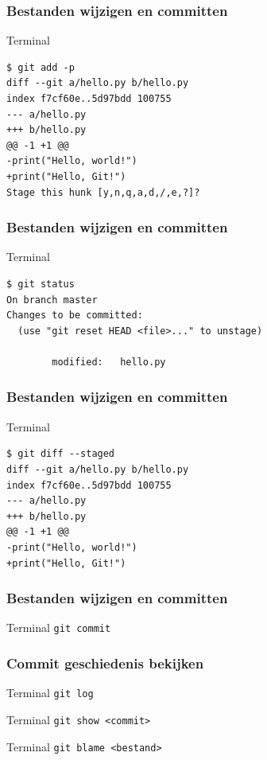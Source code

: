 \documentclass[]{beamer}
\begin{document}
\begin{frame}[fragile]
    \frametitle{Bestanden wijzigen en committen}

    \begin{block}{Terminal}
\begin{Verbatim}[fontsize=\tiny]
$ git add -p
diff --git a/hello.py b/hello.py
index f7cf60e..5d97bdd 100755
--- a/hello.py
+++ b/hello.py
@@ -1 +1 @@
-print("Hello, world!")
+print("Hello, Git!")
Stage this hunk [y,n,q,a,d,/,e,?]?
\end{Verbatim}
    \end{block}
\end{frame}

\begin{frame}[fragile]
    \frametitle{Bestanden wijzigen en committen}

    \begin{block}{Terminal}
\begin{Verbatim}[fontsize=\tiny]
$ git status
On branch master
Changes to be committed:
  (use "git reset HEAD <file>..." to unstage)

        modified:   hello.py
\end{Verbatim}
    \end{block}
\end{frame}

\begin{frame}[fragile]
    \frametitle{Bestanden wijzigen en committen}

    \begin{block}{Terminal}
\begin{Verbatim}[fontsize=\tiny]
$ git diff --staged
diff --git a/hello.py b/hello.py
index f7cf60e..5d97bdd 100755
--- a/hello.py
+++ b/hello.py
@@ -1 +1 @@
-print("Hello, world!")
+print("Hello, Git!")
\end{Verbatim}
    \end{block}
\end{frame}

\begin{frame}[fragile]
    \frametitle{Bestanden wijzigen en committen}

    \begin{block}{Terminal}
    \verb/git commit/
    \end{block}
\end{frame}

\begin{frame}[fragile]
    \frametitle{Commit geschiedenis bekijken}

    \begin{block}{Terminal}
    \verb/git log/
    \end{block}

    \pause

    \begin{block}{Terminal}
    \verb/git show <commit>/
    \end{block}

    \pause

    \begin{block}{Terminal}
    \verb/git blame <bestand>/
    \end{block}
\end{frame}
\end{document}

